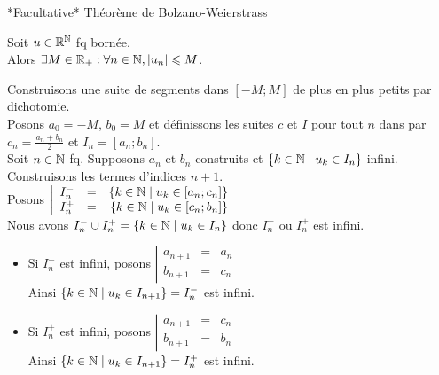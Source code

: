 \documentclass{article}
\begin{document}
	\begin{question_kholle}
		{*Facultative* Théorème de Bolzano-Weierstrass}

		Soit $u \in \mathbb R^{\mathbb N}$ fq bornée. \\
		Alors $\exists M \in \mathbb R_+ : \forall n \in \mathbb N, |u_n| \leqslant M$.

		Construisons une suite de segments dans $[-M;M]$ de plus en plus petits par dichotomie. \\
		Posons $a_0 = -M$, $b_0 = M$ et définissons les suites $c$ et $I$ pour tout $n$ dans \N par $c_n = \frac{a_n + b_n}{2}$ et $I_n = [a_n;b_n]$. \\
		
		\noindent Soit $n\in \mathbb N$ fq.
		Supposons $a_n \text{ et } b_n$ construits et $\{ k \in \mathbb N \;|\; u_k \in I_n \}$ infini.
		Construisons les termes d'indices $n+1$. \\
		Posons $\left| \begin{array}{lcr}
			I_n^- &=& \{ k \in \mathbb N \;|\; u_k \in [a_n;c_n] \} \\
			I_n^+ &=& \{ k \in \mathbb N \;|\; u_k \in [c_n;b_n] \} \\
		\end{array} \right.$ \\
		Nous avons $I_n^- \cup I_n^+ = \{ k \in \mathbb N \;|\; u_k \in I_n \}$ donc $I_n^-$ ou $I_n^+$ est infini.

		\begin{itemize}
			\item Si $I_n^-$ est infini, posons $\left| \begin{array}{lcl}
				a_{n+1} &=& a_n \\
				b_{n+1} &=& c_n
			\end{array} \right.$ \\
			Ainsi $\{ k \in \mathbb N \;|\; u_k \in I_{n+1} \} = I_n^-$ est infini.
			\item Si $I_n^+$ est infini, posons $\left| \begin{array}{lcl}
				a_{n+1} &=& c_n \\
				b_{n+1} &=& b_n
			\end{array} \right.$ \\
			Ainsi $\{ k \in \mathbb N \;|\; u_k \in I_{n+1} \} = I_n^+$ est infini.
		\end{itemize}
		\bigbreak


\end{question_kholle}
\end{document}
